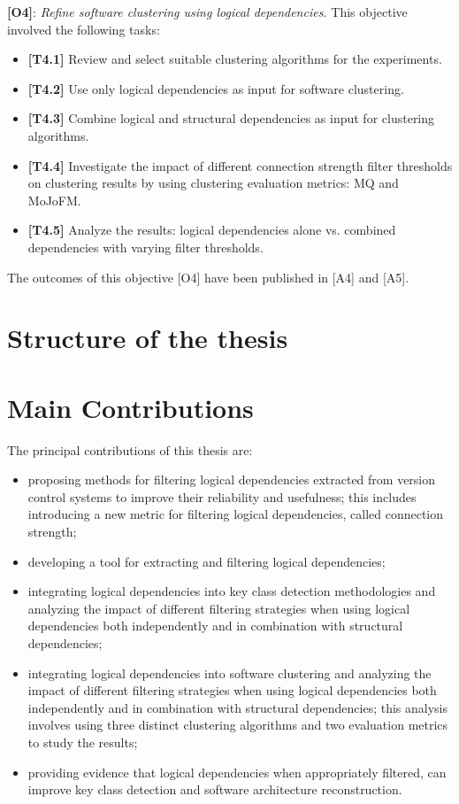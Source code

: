 \textbf{[O4]}: \textit{Refine software clustering using logical dependencies.}
This objective involved the following tasks:
\begin{itemize}
\item \textbf{[T4.1]} Review and select suitable clustering algorithms for the experiments.
\item \textbf{[T4.2]} Use only logical dependencies as input for software clustering.
\item \textbf{[T4.3]} Combine logical and structural dependencies as input for clustering algorithms.
\item \textbf{[T4.4]} Investigate the impact of different connection strength filter thresholds on clustering results by using clustering evaluation metrics: MQ and MoJoFM.
\item \textbf{[T4.5]} Analyze the results: logical dependencies alone vs. combined dependencies with varying filter thresholds.
\end{itemize}

The outcomes of this objective [O4] have been published in [A4] and [A5].

\section{Structure of the thesis}

\section{Main Contributions}

\hspace{4em}The principal contributions of this thesis are:  
\begin{itemize}  
    \item proposing methods for filtering logical dependencies extracted from version control systems to improve their reliability and usefulness; this includes introducing a new metric for filtering logical dependencies, called connection strength;  
    \item developing a tool for extracting and filtering logical dependencies;  
    \item integrating logical dependencies into key class detection methodologies and analyzing the impact of different filtering strategies when using logical dependencies both independently and in combination with structural dependencies;  
    \item integrating logical dependencies into software clustering and analyzing the impact of different filtering strategies when using logical dependencies both independently and in combination with structural dependencies; this analysis involves using three distinct clustering algorithms and two evaluation metrics to study the results;  
    \item providing evidence that logical dependencies when appropriately filtered, can improve key class detection and software architecture reconstruction.  
\end{itemize}  

